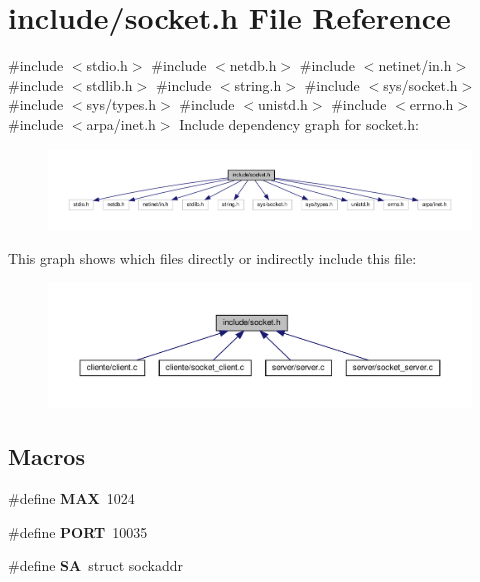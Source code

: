 \section{include/socket.h File Reference}
\label{socket_8h}
{\ttfamily \#include $<$stdio.\+h$>$}\newline
{\ttfamily \#include $<$netdb.\+h$>$}\newline
{\ttfamily \#include $<$netinet/in.\+h$>$}\newline
{\ttfamily \#include $<$stdlib.\+h$>$}\newline
{\ttfamily \#include $<$string.\+h$>$}\newline
{\ttfamily \#include $<$sys/socket.\+h$>$}\newline
{\ttfamily \#include $<$sys/types.\+h$>$}\newline
{\ttfamily \#include $<$unistd.\+h$>$}\newline
{\ttfamily \#include $<$errno.\+h$>$}\newline
{\ttfamily \#include $<$arpa/inet.\+h$>$}\newline
Include dependency graph for socket.\+h\+:\nopagebreak
\begin{figure}[H]
\begin{center}
\leavevmode
\includegraphics[width=350pt]{socket_8h__incl}
\end{center}
\end{figure}
This graph shows which files directly or indirectly include this file\+:\nopagebreak
\begin{figure}[H]
\begin{center}
\leavevmode
\includegraphics[width=350pt]{socket_8h__dep__incl}
\end{center}
\end{figure}
\subsection*{Macros}
\begin{DoxyCompactItemize}
\item 
\#define \textbf{ M\+AX}~1024
\item 
\#define \textbf{ P\+O\+RT}~10035
\item 
\#define \textbf{ SA}~struct sockaddr
\end{DoxyCompactItemize}
